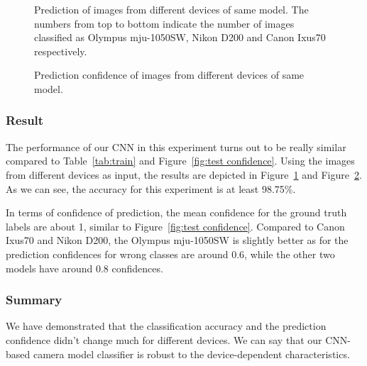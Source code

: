 \documentclass[a4paper, 9pt, twocolumn]{extarticle}
\begin{document}
\begin{figure}
	\centering
	\resizebox{!}{!}{
		{}
	}
	\caption{Prediction of images from different devices of same model. The numbers from top to bottom indicate the number of images classified as Olympus mju-1050SW, Nikon D200 and Canon Ixus70 respectively.}
	\label{fig:ins result}
\end{figure}

\begin{figure}
	\centering
	\resizebox{!}{!}{
		{}
	}
	\caption{Prediction confidence of images from different devices of same model.}
	\label{fig:ins confidence}
\end{figure}

\subsubsection*{Result}
\label{section:instance result}

The performance of our CNN in this experiment turns out to be really similar compared to Table~\ref{tab:train} and Figure~\ref{fig:test confidence}. Using the images from different devices as input, the results are depicted in Figure~\ref{fig:ins result} and Figure~\ref{fig:ins confidence}. As we can see, the accuracy for this experiment is at least 98.75\%.

In terms of confidence of prediction, the mean confidence for the ground truth labels are about 1, similar to Figure~\ref{fig:test confidence}. Compared to Canon Ixus70 and Nikon D200, the Olympus mju-1050SW is slightly better as for the prediction confidences for wrong classes are around 0.6, while the other two models have around 0.8 confidences.

\subsubsection*{Summary}
\label{section:instance summary}

We have demonstrated that the classification accuracy and the prediction confidence didn't change much for different devices. We can say that our CNN-based camera model classifier is robust to the device-dependent characteristics.
\end{document}
